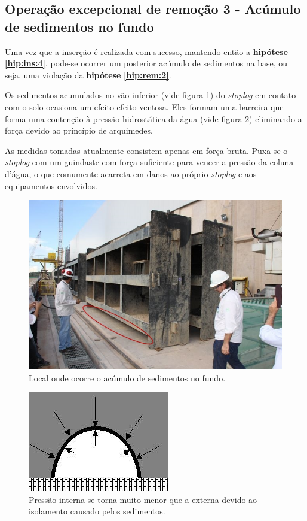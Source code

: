 \subsection{Operação excepcional de remoção 3 - Acúmulo de sedimentos no fundo}
\label{op:rem:3}
Uma vez que a inserção é realizada com sucesso, mantendo então a \textbf{hipótese}
\textbf{\ref{hip:ins:4}}, pode-se ocorrer um posterior acúmulo de sedimentos na
base, ou seja, uma violação da \textbf{hipótese} \textbf{\ref{hip:rem:2}}.

Os sedimentos acumulados no vão inferior (vide figura \ref{fig:op:rem:3_1}) do
\emph{stoplog} em contato com o solo ocasiona um efeito efeito ventosa. Eles
formam uma barreira que forma uma contenção à pressão hidrostática da água (vide
figura \ref{fig:op:rem:3_2})  eliminando a força devido ao princípio de
arquimedes.

As medidas tomadas atualmente consistem apenas em força bruta. Puxa-se o
\emph{stoplog} com um guindaste com força suficiente para vencer a pressão da
coluna d'água, o que comumente acarreta em danos ao próprio \emph{stoplog} e aos
equipamentos envolvidos.

\begin{figure}[h!]
    \centering
    \includegraphics[width=0.6\columnwidth]{figs/modos/op_rem_3/op_rem_3_1.jpg}
    \caption{Local onde ocorre o acúmulo de sedimentos no fundo.}
    \label{fig:op:rem:3_1}
\end{figure}


\begin{figure}[h!]
    \centering
    \includegraphics[width=0.6\columnwidth]{figs/modos/op_rem_3/op_rem_3_2.jpg}
    \caption{Pressão interna se torna muito menor que a externa devido ao
    isolamento causado pelos sedimentos.}
    \label{fig:op:rem:3_2}
\end{figure}


